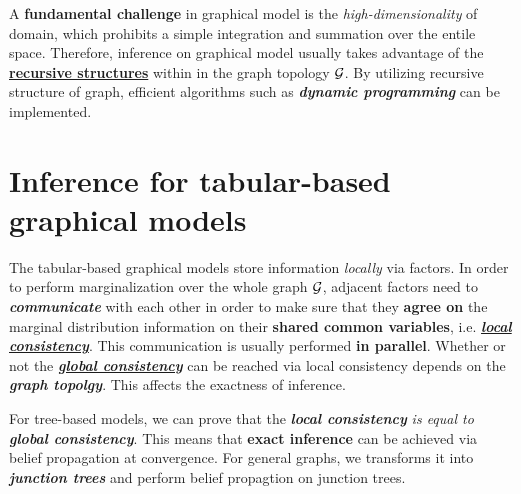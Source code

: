 \documentclass[11pt]{article}
\begin{document}
A \textbf{fundamental challenge} in graphical model is the \emph{high-dimensionality} of domain, which prohibits a simple integration and summation over the entile space. Therefore, inference on graphical model usually takes advantage of the \underline{\textbf{recursive structures}} within in the graph topology ${\mathcal G}$. By utilizing recursive structure of graph, efficient algorithms such as \emph{\textbf{dynamic programming}} can be implemented.

\section{Inference for tabular-based graphical models}
The  tabular-based graphical models store information \emph{locally} via factors. In order to perform marginalization over the whole graph ${\mathcal G}$,  adjacent factors need to \emph{\textbf{communicate}} with each other in order to make sure that they \textbf{agree on} the marginal distribution information on their \textbf{shared common variables}, i.e. \underline{\textbf{\emph{local consistency}}}. This communication is usually performed \textbf{in parallel}. Whether or not the \underline{\textbf{\emph{global consistency}}} can be reached via local consistency depends on the \textbf{\emph{graph topolgy}}. This affects the exactness of inference.  

For tree-based models, we can prove that the \textbf{\emph{local consistency}} \emph{is equal to} \textbf{\emph{global consistency}}.  This means that \textbf{exact inference} can be achieved via belief propagation at convergence. For general graphs, we transforms it into \emph{\textbf{junction trees}} and perform belief propagtion on junction trees.



%
\end{document}
